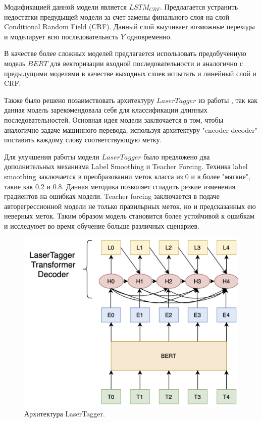 Модификацией данной модели является $LSTM_{CRF}$. Предлагается устранить недостатки предудыщей модели за счет замены финального слоя на слой Conditional Random Field (CRF). Данный слой выучивает возможные переходы и моделирует всю последовательнсть $Y$ одновременно.

В качестве более сложных моделей предлагается использовать предобученную модель $BERT$ для векторизации входной последовательности и аналогично с предыдущими моделями в качестве выходных слоев испытать и линейный слой и CRF.

Также было решено позаимствовать архитектуру $LaserTagger$ из работы \cite{malmi2019encode}, так как данная модель зарекомендовала себя для классификации длинных последовательностей. Основная идея модели заключается в том, чтобы аналогично задаче машинного перевода, используя архитектуру "encoder-decoder" поставить каждому слову соответствующую метку.

Для улучшения работы модели $LaserTagger$ было предложено два дополнительных механизма Label Smoothing и Teacher Forcing. Техника label smoothing заключается в преобразовании меток класса из 0 и в более "мягкие", такие как 0.2 и 0.8. Данная методика позволяет сгладить резкие изменения градиентов на ошибках модели. Teacher forcing заключается в подаче авторегрессионной модели не только правильрных меток, но и предсказанных ею неверных меток. Таким образом модель становится более устойчивой к ошибкам и исследуюет во время обучение больше различных сценариев. 

\begin{figure}[h!]
\centering
\includegraphics[scale=.5]{lasertagger.png}
\caption{Архитектура LaserTagger.}
\label{Problem_Picture}
\end{figure}


